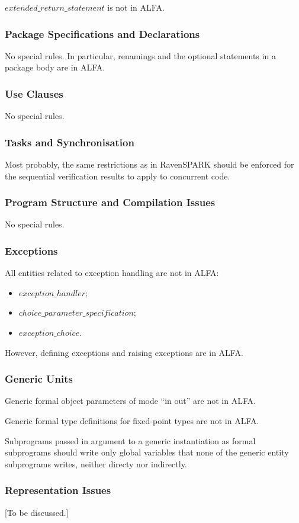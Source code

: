 \documentclass{article}
\newcommand{\bnf}[1]{$\mathit{#1}$}
\begin{document}
\bnf{extended\_return\_statement} is not in ALFA.

\subsubsection{Package Specifications and Declarations}

No special rules. In particular, renamings and the optional statements in a
package body are in ALFA.

\subsubsection{Use Clauses}

No special rules.

\subsubsection{Tasks and Synchronisation}

Most probably, the same restrictions as in RavenSPARK should be enforced for
the sequential verification results to apply to concurrent code.

\subsubsection{Program Structure and Compilation Issues}

No special rules.

\subsubsection{Exceptions}

All entities related to exception handling are not in ALFA:
\begin{itemize}
\item \bnf{exception\_handler};
\item \bnf{choice\_parameter\_specification};
\item \bnf{exception\_choice}.
\end{itemize}

However, defining exceptions and raising exceptions are in ALFA.

\subsubsection{Generic Units}

Generic formal object parameters of mode ``in out'' are not in ALFA.

Generic formal type definitions for fixed-point types are not in ALFA.

Subprograms passed in argument to a generic instantiation as formal subprograms
should write only global variables that none of the generic entity subprograms
writes, neither directy nor indirectly.

\subsubsection{Representation Issues}

[To be discussed.]
\end{document}

